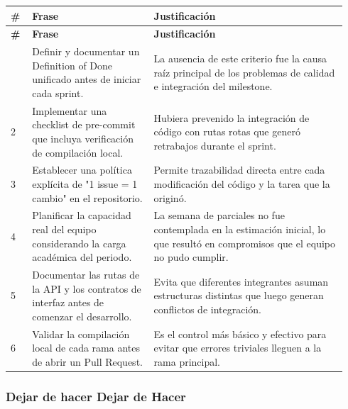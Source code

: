 \documentclass[11pt,a4paper]{article}
\begin{document}
\begingroup
\scriptsize
\setlength{\tabcolsep}{3pt}
\begin{longtable}{P{0.06\linewidth}P{0.34\linewidth}P{0.54\linewidth}}
\toprule
\textbf{\#} & \textbf{Frase} & \textbf{Justificación} \\
\midrule
\endfirsthead
\toprule
\textbf{\#} & \textbf{Frase} & \textbf{Justificación} \\
\midrule
\endhead
\bottomrule
{} & Definir y documentar un Definition of Done unificado antes de iniciar cada sprint. & La ausencia de este criterio fue la causa raíz principal de los problemas de calidad e integración del milestone. \\
2 & Implementar una checklist de pre-commit que incluya verificación de compilación local. & Hubiera prevenido la integración de código con rutas rotas que generó retrabajos durante el sprint. \\
3 & Establecer una política explícita de "1 issue = 1 cambio" en el repositorio. & Permite trazabilidad directa entre cada modificación del código y la tarea que la originó. \\
4 & Planificar la capacidad real del equipo considerando la carga académica del periodo. & La semana de parciales no fue contemplada en la estimación inicial, lo que resultó en compromisos que el equipo no pudo cumplir. \\
5 & Documentar las rutas de la API y los contratos de interfaz antes de comenzar el desarrollo. & Evita que diferentes integrantes asuman estructuras distintas que luego generan conflictos de integración. \\
6 & Validar la compilación local de cada rama antes de abrir un Pull Request. & Es el control más básico y efectivo para evitar que errores triviales lleguen a la rama principal. \\
\end{longtable}
\endgroup

\subsubsection{Dejar de hacer Dejar de Hacer}
\end{document}
